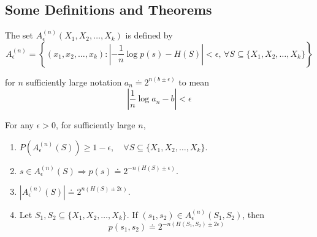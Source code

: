 \subsection{Some Definitions and Theorems}
%
\begin{tcolorbox}[boxrule=0pt,frame hidden,sharp corners,enhanced, opacityback=0, borderline west={2pt}{0pt}{red}]
\begin{defn}The set \( A^{(n)}_\epsilon (X_1, X_2, \ldots, X_k) \) is defined by
\begin{equation}
    A^{(n)}_\epsilon = \left\{ (x_1, x_2, \ldots, x_k) : \left| -\frac{1}{n} \log p(s) - H(S) \right| < \epsilon, \, \forall S \subseteq \{X_1, X_2, \ldots, X_k\} \right\}
\end{equation}
\end{defn}
\end{tcolorbox}
%
%
\begin{tcolorbox}[boxrule=0pt,frame hidden,sharp corners,enhanced, opacityback=0, borderline west={2pt}{0pt}{red}]
\begin{defn}for \(n\) sufficiently large notation \( a_n \doteq 2^{n(b \pm \epsilon)} \) to mean
\begin{equation}
    \left| \frac{1}{n} \log a_n - b \right| < \epsilon 
\end{equation}
\end{defn}
\end{tcolorbox}
%
%
\begin{tcolorbox}[boxrule=0pt,frame hidden,sharp corners,enhanced, opacityback=0, borderline west={2pt}{0pt}{blue}]
\begin{thm}For any \( \epsilon > 0 \), for sufficiently large \( n \),
\begin{enumerate}
    \item \( P(A^{(n)}_\epsilon(S)) \geq 1 - \epsilon, \quad \forall S \subseteq \{X_1, X_2, \ldots, X_k\}. \)
    \item \( s \in A^{(n)}_\epsilon(S) \Rightarrow p(s) \doteq 2^{-n(H(S) \pm \epsilon)}. \) 
    \item \( |A^{(n)}_\epsilon(S)| \doteq 2^{n(H(S) \pm 2\epsilon)}. \) 
    \item Let \( S_1, S_2 \subseteq \{X_1, X_2, \ldots, X_k\} \). If \((s_1, s_2) \in A^{(n)}_\epsilon(S_1, S_2)\), then
    \begin{equation}
        p(s_1, s_2) \doteq 2^{-n(H(S_1, S_2) \pm 2\epsilon)}
    \end{equation}
\end{enumerate}
\end{thm}
\end{tcolorbox}

